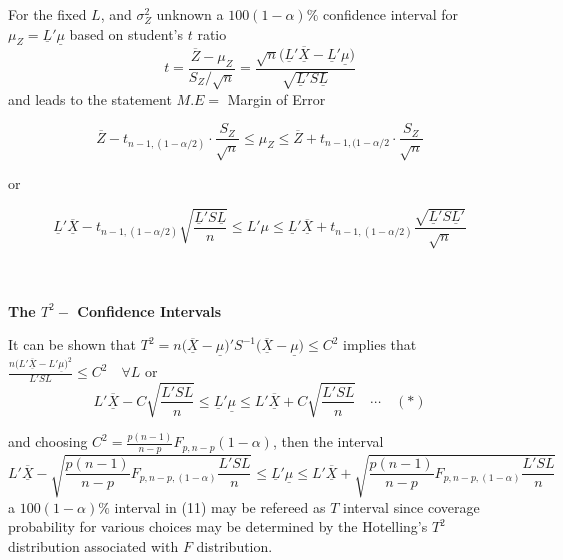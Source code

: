 \documentclass[11pt,a4paper]{article}
\theoremstyle{definition}
\begin{document}
For the fixed $L$, and $\sigma^2_Z$ unknown  a $100(1-\alpha)\%$ confidence interval for $\mu_Z = \underline{L}'\underline{\mu}$ based on student's $t$ ratio
\begin{equation}\tag{9}
t = \frac{\overline{Z}-\mu_Z}{S_Z/\sqrt{n}}=\frac{\sqrt{n}\big(\underline{L}'\overline{\underline{X}}-\underline{L}'\underline{\mu}\big)}{\sqrt{\underline{L}'S\underline{L}}}
\end{equation}
and leads to the statement $M.E=$ Margin of Error

$$\overline{Z}-t_{n-1,(1-\alpha/2)}\cdot \frac{S_Z}{\sqrt{n}}\leq \mu_Z \leq \overline{Z}+t_{n-1,(1-\alpha/2}\cdot \frac{S_Z}{\sqrt{n}}$$

or 

\begin{equation}\tag{10}
\underline{L}'\overline{\underline{X}}-t_{n-1, (1-\alpha/2)} \sqrt{\frac{\underline{L}'S\underline{L}}{n}} \leq L'\mu \leq \underline{L}'\overline{\underline{X}} + t_{n-1,(1-\alpha/2)}\frac{\sqrt{\underline{L}'S\underline{L}'}}{\sqrt{n}}
\end{equation}\\\\



\begin{center}
\textbf{The $T^2-$ Confidence Intervals}
\end{center}
It can be shown that $T^2=n\big(\overline{\underline{X}}-\underline{\mu}\big)'S^{-1}\big(\overline{\underline{X}}-\underline{\mu}\big)\leq C^2$ implies that $\frac{n\big(L'\overline{\underline{X}}-L'\underline{\mu}\big)^2}{L'SL}\leq C^2\quad  \forall L$ or 
$$L'\overline{\underline{X}}-C\sqrt{\frac{L'SL}{n}}\leq \underline{L}'\underline{\mu}\leq L'\underline{\overline{X}}+C\sqrt{\frac{L'SL}{n}}\quad  \cdots\quad (*)$$

and choosing $C^2= \frac{p(n-1)}{n-p}F_{p,n-p}(1-\alpha)$, then the interval \begin{equation}\tag{11}
L'\overline{\underline{X}}- \sqrt{\frac{p(n-1)}{n-p}F_{p,n-p,(1-\alpha)}\frac{L'SL}{n}}\leq \underline{L}'\underline{\mu}\leq L'\overline{\underline{X}}+\sqrt{\frac{p(n-1)}{n-p}F_{p,n-p,(1-\alpha)}\frac{L'SL}{n}}
\end{equation}
a $100(1-\alpha)\%$ interval in (11) may be refereed as $T$ interval since coverage probability for various choices may be determined by the Hotelling's $T^2$ distribution associated with $F$ distribution.\\\\
\end{document}
